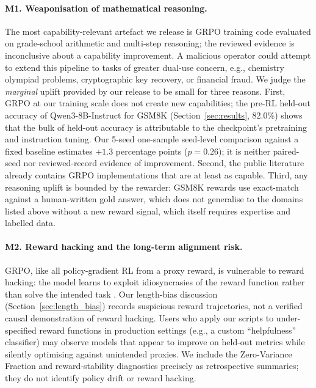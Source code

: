 \paragraph{M1. Weaponisation of mathematical reasoning.}
The most capability-relevant artefact we release is GRPO training code evaluated
on grade-school arithmetic and multi-step reasoning; the reviewed evidence is
inconclusive about a capability improvement. A malicious
operator could attempt to extend this pipeline to tasks of greater
dual-use concern, e.g., chemistry olympiad problems, cryptographic key
recovery, or financial fraud. We judge the \emph{marginal} uplift provided
by our release to be small for three reasons. First, GRPO at our training
scale does not create new capabilities; the pre-RL held-out accuracy of
Qwen3-8B-Instruct for GSM8K (Section~\ref{sec:results}, 82.0\%) shows that the
bulk of held-out accuracy is attributable to the checkpoint's pretraining and
instruction tuning. Our 5-seed one-sample seed-level comparison against a fixed
baseline estimates \(+1.3\) percentage points ($p{=}0.26$); it is neither
paired-seed nor reviewed-record evidence of improvement.
Second, the public literature already contains GRPO implementations
\cite{shao2024deepseekmath, openrlhf2024, verl2024, vonwerra2022trl} that are at
least as capable. Third, any reasoning uplift is bounded by the rewarder:
GSM8K rewards use exact-match against a human-written gold answer, which
does not generalise to the domains listed above without a new reward
signal, which itself requires expertise and labelled data.

\paragraph{M2. Reward hacking and the long-term alignment risk.}
GRPO, like all policy-gradient RL from a proxy reward, is vulnerable to
reward hacking: the model learns to exploit idiosyncrasies of the reward
function rather than solve the intended task \cite{skalse2022specificationgaming,
krakovna2020specification}. Our length-bias discussion
(Section~\ref{sec:length_bias}) records suspicious reward trajectories, not
a verified causal demonstration of reward hacking.
Users who apply our scripts to under-specified reward functions in
production settings (e.g., a custom ``helpfulness'' classifier) may observe
models that appear to improve on held-out metrics while silently
optimising against unintended proxies. We include the Zero-Variance
Fraction and reward-stability diagnostics precisely as retrospective summaries; they do not identify policy drift or reward hacking.

